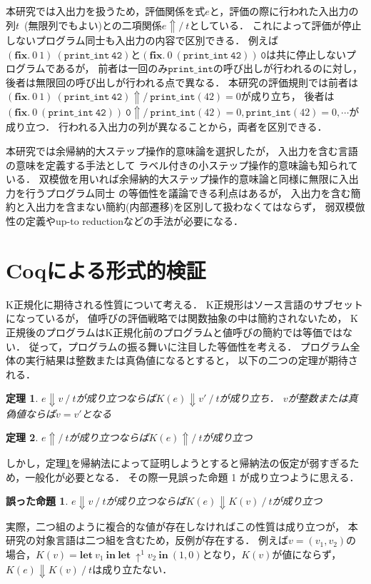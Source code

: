 \documentclass[T]{compsoft}
\newcommand{\keyword}[1]{\mathbf{#1}}
\newcommand{\LET}{\keyword{let}}
\newcommand{\FIX}{\keyword{fix}}
\newcommand{\IN}{\keyword{in}}
\newcommand{\theoremname}{定理}
\newtheorem{theorem}{\theoremname}
\newcommand{\wrongpropositioname}{誤った命題}
\newtheorem{wrongproposition}{\wrongpropositioname}
\begin{document}
本研究では入出力を扱うため，評価関係を式$e$と，評価の際に行われた入出力の列$t$~(無限列でもよい)との二項関係$e \Uparrow /~t$としている．
これによって評価が停止しないプログラム同士も入出力の内容で区別できる．
例えば$(\FIX.~0~1)~(\texttt{print\_int}~\texttt{42})$と$(\FIX.~0~(\texttt{print\_int}~\texttt{42}))~\texttt{0}$は共に停止しないプログラムであるが，
前者は一回のみ$\texttt{print\_int}$の呼び出しが行われるのに対し，後者は無限回の呼び出しが行われる点で異なる．
本研究の評価規則では前者は$(\FIX.~0~1)~(\texttt{print\_int}~\texttt{42})\Uparrow/~\texttt{print\_int}(42)=0$が成り立ち，
後者は$(\FIX.~0~(\texttt{print\_int}~\texttt{42}))~\texttt{0}\Uparrow /~\texttt{print\_int}(42)=0, \texttt{print\_int}(42)=0, \cdots$が成り立つ．
行われる入出力の列が異なることから，両者を区別できる．

本研究では余帰納的大ステップ操作的意味論を選択したが，
入出力を含む言語の意味を定義する手法として
ラベル付きの小ステップ操作的意味論も知られている．
双模倣を用いれば余帰納的大ステップ操作的意味論と同様に無限に入出力を行うプログラム同士
の等価性を議論できる利点はあるが，
入出力を含む簡約と入出力を含まない簡約(内部遷移)を区別して扱わなくてはならず，
弱双模倣性の定義やup-to reductionなどの手法が必要になる．

\section{Coqによる形式的検証}\label{section:verification}
K正規化に期待される性質について考える．
K正規形はソース言語のサブセットになっているが，
値呼びの評価戦略では関数抽象の中は簡約されないため，
K正規後のプログラムはK正規化前のプログラムと値呼びの簡約では等価ではない．
従って，プログラムの振る舞いに注目した等価性を考える．
プログラム全体の実行結果は整数または真偽値になるとすると，
以下の二つの定理が期待される．
\begin{theorem}\label{theorem:eval-correctness}
	$e\Downarrow v~/~t$が成り立つならば$K(e)\Downarrow v'~/~t$が成り立ち．
	$v$が整数または真偽値ならば$v=v'$となる
\end{theorem}
\begin{theorem}\label{theorem:diverge-correctness}
	$e\Uparrow/~t$が成り立つならば$K(e)\Uparrow/~t$が成り立つ
\end{theorem}

しかし，\theoremname\ref{theorem:eval-correctness}を帰納法によって証明しようとすると帰納法の仮定が弱すぎるため，一般化が必要となる．
その際一見\wrongpropositioname
1 %
が成り立つように思える．
\begin{wrongproposition}\label{wrongproposition:wrong-lemma}
	$e\Downarrow v~/~t$が成り立つならば$K(e)\Downarrow K(v)~/~t$が成り立つ
\end{wrongproposition}
実際，二つ組のように複合的な値が存在しなければこの性質は成り立つが，
本研究の対象言語は二つ組を含むため，反例が存在する．
例えば$v=(v_1,v_2)$の場合，$K(v)=\LET~v_1~\IN~\LET~\uparrow^1 v_2~\IN~(1,0)$となり，$K(v)$が値にならず，
$K(e)\Downarrow K(v)~/~t$は成り立たない．
\end{document}
